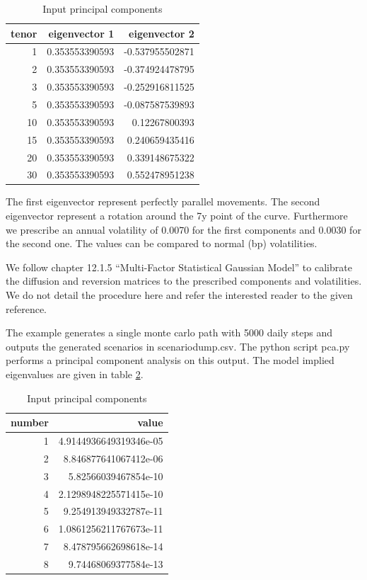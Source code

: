 \begin{table}[hbt]
\begin{center}
\begin{tabular}{r|r|r}
tenor & eigenvector 1  & eigenvector 2   \\
\hline
1     & 0.353553390593 & -0.537955502871 \\
2     & 0.353553390593 & -0.374924478795 \\
3     & 0.353553390593 & -0.252916811525 \\
5     & 0.353553390593 & -0.087587539893 \\
10    & 0.353553390593 & 0.12267800393   \\
15    & 0.353553390593 & 0.240659435416  \\
20    & 0.353553390593 & 0.339148675322  \\
30    & 0.353553390593 & 0.552478951238
\end{tabular}
\caption{Input principal components}
\label{tab:ex37_1}
\end{center}
\end{table}

The first eigenvector represent perfectly parallel movements. The second eigenvector represent a rotation around the 7y
point of the curve. Furthermore we prescribe an annual volatility of 0.0070 for the first components and 0.0030 for the
second one. The values can be compared to normal (bp) volatilities.

We follow \cite{Andersen_Piterbarg_2010} chapter 12.1.5 ``Multi-Factor Statistical Gaussian Model'' to calibrate the
diffusion and reversion matrices to the prescribed components and volatilities. We do not detail the procedure here and
refer the interested reader to the given reference.

The example generates a single monte carlo path with 5000 daily steps and outputs the generated scenarios in
scenariodump.csv. The python script pca.py performs a principal component analysis on this output. The model implied
eigenvalues are given in table \ref{tab:ex37_2}.

\begin{table}[hbt]
\begin{center}
\begin{tabular}{r|r}
number & value                  \\
\hline
1      & 4.9144936649319346e-05 \\
2      & 8.846877641067412e-06  \\
3      & 5.82566039467854e-10   \\
4      & 2.1298948225571415e-10 \\
5      & 9.254913949332787e-11  \\
6      & 1.0861256211767673e-11 \\
7      & 8.478795662698618e-14  \\
8      & 9.74468069377584e-13   \\
\end{tabular}
\caption{Input principal components}
\label{tab:ex37_2}
\end{center}
\end{table}

